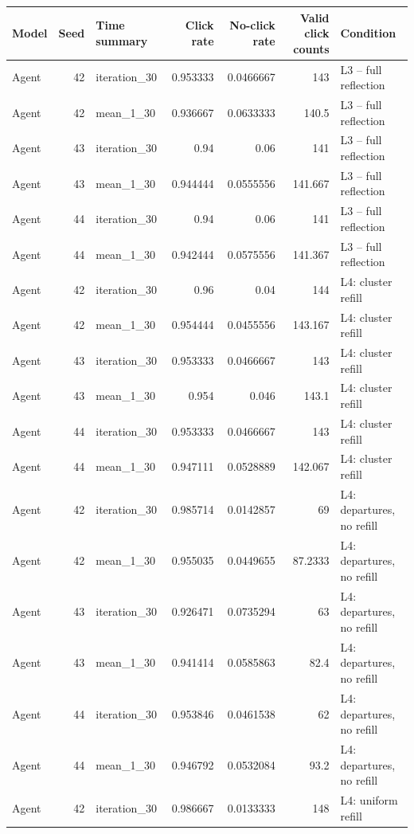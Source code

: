 \begin{table}[htbp!]
\centering
\small
\setlength{\tabcolsep}{3pt}
\renewcommand{\arraystretch}{1.1}
\begin{tabular}{lrlrrrl}
\hline
Model & Seed & Time summary & Click rate & No-click rate & Valid click counts & Condition \\
\hline
Agent & 42 & iteration\_30 & 0.953333 & 0.0466667 & 143 & L3 -- full reflection \\
Agent & 42 & mean\_1\_30 & 0.936667 & 0.0633333 & 140.5 & L3 -- full reflection \\
Agent & 43 & iteration\_30 & 0.94 & 0.06 & 141 & L3 -- full reflection \\
Agent & 43 & mean\_1\_30 & 0.944444 & 0.0555556 & 141.667 & L3 -- full reflection \\
Agent & 44 & iteration\_30 & 0.94 & 0.06 & 141 & L3 -- full reflection \\
Agent & 44 & mean\_1\_30 & 0.942444 & 0.0575556 & 141.367 & L3 -- full reflection \\
Agent & 42 & iteration\_30 & 0.96 & 0.04 & 144 & L4: cluster refill \\
Agent & 42 & mean\_1\_30 & 0.954444 & 0.0455556 & 143.167 & L4: cluster refill \\
Agent & 43 & iteration\_30 & 0.953333 & 0.0466667 & 143 & L4: cluster refill \\
Agent & 43 & mean\_1\_30 & 0.954 & 0.046 & 143.1 & L4: cluster refill \\
Agent & 44 & iteration\_30 & 0.953333 & 0.0466667 & 143 & L4: cluster refill \\
Agent & 44 & mean\_1\_30 & 0.947111 & 0.0528889 & 142.067 & L4: cluster refill \\
Agent & 42 & iteration\_30 & 0.985714 & 0.0142857 & 69 & L4: departures, no refill \\
Agent & 42 & mean\_1\_30 & 0.955035 & 0.0449655 & 87.2333 & L4: departures, no refill \\
Agent & 43 & iteration\_30 & 0.926471 & 0.0735294 & 63 & L4: departures, no refill \\
Agent & 43 & mean\_1\_30 & 0.941414 & 0.0585863 & 82.4 & L4: departures, no refill \\
Agent & 44 & iteration\_30 & 0.953846 & 0.0461538 & 62 & L4: departures, no refill \\
Agent & 44 & mean\_1\_30 & 0.946792 & 0.0532084 & 93.2 & L4: departures, no refill \\
Agent & 42 & iteration\_30 & 0.986667 & 0.0133333 & 148 & L4: uniform refill \\

\end{tabular}
\end{table}
